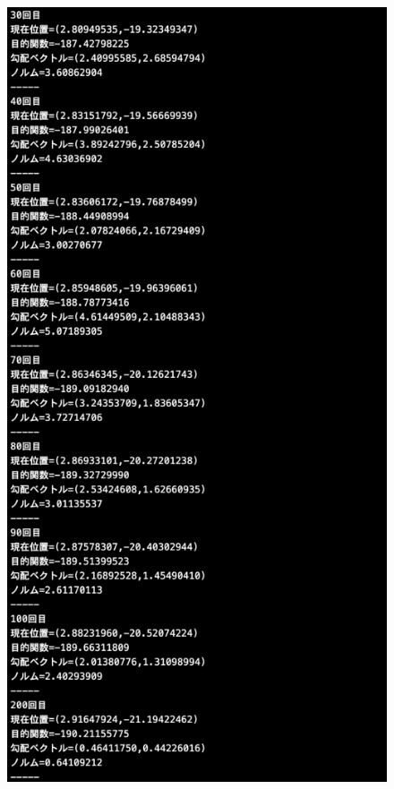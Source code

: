 \documentclass[12pt]{jarticle}
\begin{document}
\begin{figure}[h]
    \begin{minipage}{0.5\hsize}
        \begin{center}
            \includegraphics[scale=0.2]{kadai1_2s_out3_3_2.png}
        \end{center}

\end{minipage}
\end{figure}
\end{document}
